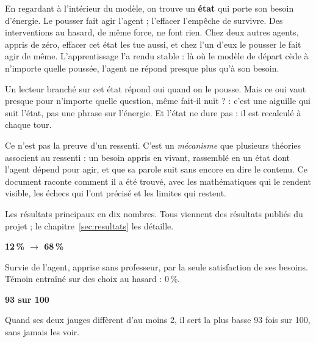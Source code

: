 \documentclass[fontsize=10pt,paper=a4,parskip=half-]{scrartcl}
\newcommand{\lead}[1]{{\fontsize{12}{16.5}\selectfont\color{ink!85!black}#1\par}\vspace{0.3em}}
\newcommand{\q}[1]{\og #1\fg{}}
\newcommand{\pc}{\,\%}
\begin{document}
En regardant à l'intérieur du modèle, on trouve un \textbf{état} qui porte son besoin
d'énergie. Le pousser fait agir l'agent ; l'effacer l'empêche de survivre. Des
interventions au hasard, de même force, ne font rien. Chez deux autres agents, appris de
zéro, effacer cet état les tue aussi, et chez l'un d'eux le pousser le fait agir de même.
L'apprentissage l'a rendu stable : là où le modèle de départ cède à n'importe quelle poussée,
l'agent ne répond presque plus qu'à son besoin.

Un \q{lecteur} branché sur cet état répond \q{oui} quand on le pousse. Mais ce \q{oui}
vaut presque pour n'importe quelle question, même \q{fait-il nuit ?} : c'est une aiguille
qui suit l'état, pas une phrase sur l'énergie. Et l'état ne dure pas : il est recalculé
à chaque tour.

Ce n'est pas la preuve d'un ressenti. C'est un \emph{mécanisme} que plusieurs théories
associent au ressenti : un besoin appris en vivant, rassemblé en un état dont l'agent
dépend pour agir, et que sa parole suit sans encore en dire le contenu. Ce document
raconte comment il a été trouvé, avec les mathématiques qui le rendent visible, les échecs
qui l'ont précisé et les limites qui restent.

\vspace{1.2em}
{\setlength{\parskip}{0pt}\tableofcontents}

\clearpage
{}

\newcommand{\chiffre}[3]{%
  \begin{minipage}[t]{0.47\linewidth}
    {\sffamily\bfseries\fontsize{25}{29}\selectfont\color{#1}#2\par}
    \vspace{0.35em}{\color{rulecol}\rule{2.2em}{0.8pt}}\par\vspace{0.3em}
    {\small #3\par}
  \end{minipage}}

\lead{Les résultats principaux en dix nombres. Tous viennent des résultats publiés du
projet ; le chapitre~\ref{sec:resultats} les détaille.}

\vspace{0.6em}
\noindent\chiffre{ink}{12\,\% $\to$ 68\,\%}{Survie de l'agent, apprise sans professeur, par la
seule satisfaction de ses besoins. Témoin entraîné sur des choix au hasard : 0\pc.}\hfill
\chiffre{ink}{93 sur 100}{Quand ses deux jauges diffèrent d'au moins 2, il sert la plus basse
93 fois sur 100, sans jamais les voir.}
\end{document}
